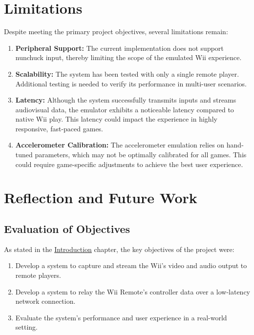 \section{Limitations}

Despite meeting the primary project objectives, several limitations remain:

\begin{enumerate}
    \item \textbf{Peripheral Support:}
          The current implementation does not support nunchuck input, thereby limiting the scope of the emulated Wii experience.
    \item \textbf{Scalability:}
          The system has been tested with only a single remote player. Additional testing is needed to verify its performance in multi-user scenarios.
    \item \textbf{Latency:}
          Although the system successfully transmits inputs and streams audiovisual data, the emulator exhibits a noticeable latency compared to native Wii play. This latency could impact the experience in highly responsive, fast-paced games.
    \item \textbf{Accelerometer Calibration:}
          The accelerometer emulation relies on hand-tuned parameters, which may not be optimally calibrated for all games. This could require game-specific adjustments to achieve the best user experience.
\end{enumerate}

\section{Reflection and Future Work}

\subsection*{Evaluation of Objectives}
As stated in the \hyperlink{chapter:introduction}{Introduction} chapter, the key objectives of the project were:

\begin{enumerate}
\item  Develop a system to capture and stream the Wii’s video and audio output to remote players.
\item Develop a system to relay the Wii Remote’s controller data over a low-latency network connection.
\item Evaluate the system’s performance and user experience in a real-world setting.
\end{enumerate}

